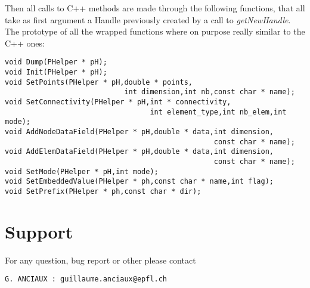 \noindent Then all calls to C++ methods are made through the following functions, that all 
take as first argument a Handle previously created by a call to  {\it getNewHandle}. The prototype 
of all the wrapped functions where on purpose really similar to the C++ ones:
\begin{lstlisting}[frame=tbrl]
void Dump(PHelper * pH);
void Init(PHelper * pH);
void SetPoints(PHelper * pH,double * points,
                            int dimension,int nb,const char * name);
void SetConnectivity(PHelper * pH,int * connectivity,
                                  int element_type,int nb_elem,int mode);
void AddNodeDataField(PHelper * pH,double * data,int dimension,
                                                 const char * name);
void AddElemDataField(PHelper * pH,double * data,int dimension,
                                                 const char * name);
void SetMode(PHelper * pH,int mode);
void SetEmbeddedValue(PHelper * ph,const char * name,int flag);
void SetPrefix(PHelper * ph,const char * dir);
\end{lstlisting}

\section{Support}

For any question, bug report or other please contact 
\begin{lstlisting}[frame=tbrl]
G. ANCIAUX : guillaume.anciaux@epfl.ch
\end{lstlisting}

